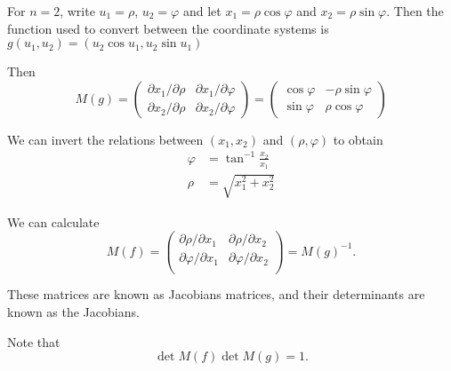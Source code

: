 \documentclass[a4paper]{article}
\begin{document}
\begin{eg}
  For $n = 2$, write $u_1 = \rho$, $u_2 =\varphi$ and let $x_1 = \rho \cos \varphi$ and $x_2 = \rho \sin \varphi$. Then the function used to convert between the coordinate systems is $g(u_1, u_2) = (u_2\cos u_1, u_2\sin u_1)$

  Then
  \[
    M(g) =
    \begin{pmatrix}
      \partial x_1/\partial \rho & \partial x_1/\partial \varphi\\
      \partial x_2/\partial \rho & \partial x_2/\partial \varphi
    \end{pmatrix}
    =
    \begin{pmatrix}
      \cos\varphi & -\rho\sin \varphi\\
      \sin \varphi & \rho \cos \varphi
    \end{pmatrix}
  \]

  We can invert the relations between $(x_1, x_2)$ and $(\rho, \varphi)$ to obtain
  \begin{align*}
    \varphi &= \tan^{-1} \frac{x_2}{x_1}\\
    \rho &= \sqrt{x_1^2 + x_2^2}
  \end{align*}

  We can calculate
  \[
    M(f) = 
    \begin{pmatrix}
      \partial\rho/\partial x_1 & \partial\rho/\partial x_2\\
      \partial\varphi/\partial x_1 & \partial\varphi/\partial x_2\\
    \end{pmatrix}
    = M(g)^{-1}.
  \]

  These matrices are known as Jacobians matrices, and their determinants are known as the Jacobians. 
\end{eg}
Note that
\[
  \det M(f)\det M(g) = 1.
\]
\end{document}
